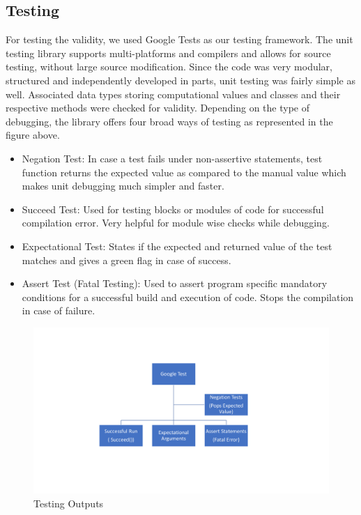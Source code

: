 \documentclass[11pt]{scrartcl}
\begin{document}
\newpage 
\subsection{Testing}
For testing the validity, we used Google Tests as our testing framework. The unit testing library supports multi-platforms and compilers and allows for source testing, without large source modification. Since the code was very modular, structured and independently developed in parts, unit testing was fairly simple as well. Associated data types storing computational values and classes and their respective methods were checked for validity. 
Depending on the type of debugging, the library offers four broad ways of testing as represented in the figure above.

\begin{itemize}
  \item Negation Test: In case a test fails under non-assertive statements, test function returns the expected value as compared to the manual value which makes unit debugging much simpler and faster.
  \item Succeed Test: Used for testing blocks or modules of code for successful compilation error. Very helpful for module wise checks while debugging.
 \item Expectational Test: States if the expected and returned value of the test matches and gives a green flag in case of success.
 \item Assert Test (Fatal Testing): Used to assert program specific mandatory conditions for a successful build and execution of code. Stops the compilation in case of failure.
\end{itemize}

\begin{figure}
	\centering
	\includegraphics[width=1\textwidth]{figs/Test.pdf}
	\caption{Testing Outputs}\label{fig:Google Test}
\end{figure}
\end{document}
